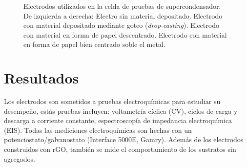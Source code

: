 
\begin{figure}
	\centering
	\caption[Electrodos utilizados en la celda de pruebas de supercondensador.]{Electrodos utilizados en la celda de pruebas de supercondensador. De izquierda a derecha: Electro sin material depositado. Electrodo con material depositado mediante goteo (\emph{drop-casting}). Electrodo con material en forma de papel descentrado. Electrodo con material en forma de papel bien centrado soble el metal.}
	\label{fig:electrodes}
\end{figure}

\section{Resultados}
Los electrodos son sometidos a pruebas electroquímicas para estudiar su desempeño, estás pruebas incluyen: voltametría cíclica (CV), ciclos de carga y descarga a corriente constante, espectroscopía de impedancia electroquímica (EIS). Todas las mediciones electroquímicas son hechas con un potenciostato/galvanostato (Interface 5000E, Gamry). Además de los electrodos construidos con rGO, también se mide el comportamiento de los sustratos sin agregados.






%






